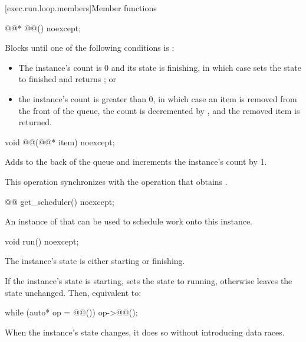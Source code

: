 [exec.run.loop.members]{Member functions}

\begin{itemdecl}
@@* @@() noexcept;
\end{itemdecl}

\begin{itemdescr}
\pnum
\effects
Blocks until one of the following conditions is :
\begin{itemize}
\item
The  instance's count is 0 and its state is finishing,
in which case  sets the state to finished
and returns ; or
\item
the  instance's count is greater than 0,
in which case an item is removed from the front of the queue,
the count is decremented by , and
the removed item is returned.
\end{itemize}
\end{itemdescr}

\begin{itemdecl}
void @@(@@* item) noexcept;
\end{itemdecl}

\begin{itemdescr}
\pnum
\effects
Adds  to the back of the queue and
increments the  instance's count by 1.

\pnum
\sync
This operation synchronizes with
the  operation that obtains .
\end{itemdescr}

%
\begin{itemdecl}
@@ get_scheduler() noexcept;
\end{itemdecl}

\begin{itemdescr}
\pnum
\returns
An instance of 
that can be used to schedule work onto this  instance.
\end{itemdescr}

%
\begin{itemdecl}
void run() noexcept;
\end{itemdecl}

\begin{itemdescr}
\pnum
\expects
The  instance's state is either starting or finishing.

\pnum
\effects
If the  instance's state is starting,
sets the state to running,
otherwise leaves the state unchanged.
Then, equivalent to:
\begin{codeblock}
while (auto* op = @@()) {
  op->@@();
}
\end{codeblock}

\pnum
\remarks
When the  instance's state changes,
it does so without introducing data races.
\end{itemdescr}

